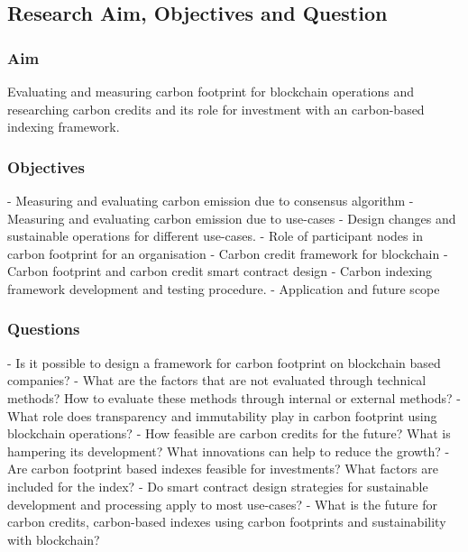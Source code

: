 \documentclass[11pt, a4paper]{article}
\begin{document}
\newpage 

\subsection*{Research Aim, Objectives and Question}

\subsubsection*{Aim}
Evaluating and measuring carbon footprint for blockchain operations and researching carbon credits and its role for investment with an carbon-based indexing framework.

\subsubsection*{Objectives} 

- Measuring and evaluating carbon emission due to consensus algorithm \newline
- Measuring and evaluating carbon emission due to use-cases  \newline
- Design changes and sustainable operations for different use-cases.  \newline
- Role of participant nodes in carbon footprint for an organisation  \newline
- Carbon credit framework for blockchain  \newline
- Carbon footprint and carbon credit smart contract design \newline
- Carbon indexing framework development and testing procedure.  \newline
- Application and future scope  \newline

\subsubsection*{Questions} 

- Is it possible to design a framework for carbon footprint on blockchain based companies? \newline
- What are the factors that are not evaluated through technical methods? How to evaluate these methods through internal or external methods? \newline
- What role does transparency and immutability play in carbon footprint using blockchain operations? \newline
- How feasible are carbon credits for the future? What is hampering its development? What innovations can help to reduce the growth? \newline
- Are carbon footprint based indexes feasible for investments? What factors are included for the index? \newline
- Do smart contract design strategies for sustainable development and processing apply to most use-cases? \newline
- What is the future for carbon credits, carbon-based indexes using carbon footprints and sustainability with blockchain? \newline
 
\end{document}
